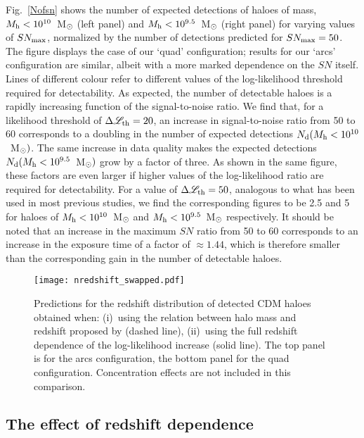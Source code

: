 \documentclass[a4paper, fleqn, usenatbib, useAMS]{mnras}
\def\DL{\Delta\mathscr{L}}
\begin{document}
Fig.~\ref{Nofsn} shows the number of expected detections
of haloes of mass, $M_{\rm h}<10^{10}$~M$_{\rm \odot}$
(left panel) and $M_{\rm h}<10^{9.5}$~M$_{\rm \odot}$ (right panel) for varying
values of $SN_{\rm max}$, normalized by the number of detections
predicted for $SN_{\rm max}=50$. The figure displays the case of our
`quad' configuration; results for our `arcs' configuration are similar, 
albeit with a more marked dependence on the $SN$ itself.
Lines of different colour refer to different
values of the log-likelihood threshold required for detectability.
As expected, the number of detectable haloes is a rapidly increasing function
of the signal-to-noise ratio. We find that, for a likelihood threshold 
of $\DL_{\rm th}=20$, an increase in signal-to-noise ratio from 
50 to 60 corresponds to a doubling in the number of expected detections
$N_{\rm d}(M_{\rm h}<10^{10}$~M$_{\rm \odot})$. The same increase in data quality 
makes the expected detections $N_{\rm d}(M_{\rm h}<10^{9.5}$~M$_{\rm \odot})$
grow by a factor of three. As shown in the same figure, these factors 
are even larger if higher values of the log-likelihood 
ratio are required for detectability. For a value of $\DL_{\rm th}=50$,
analogous to what has been used in most previous studies, we find the corresponding
figures to be 2.5 and 5 for haloes of $M_{\rm h}<10^{10}$~M$_{\rm \odot}$ and 
$M_{\rm h}<10^{9.5}$~M$_{\rm \odot}$ respectively. It should be noted that
an increase in the maximum $SN$ ratio from 50 to 60 corresponds to 
an increase in the exposure time of a factor of $\approx 1.44$, {which is therefore smaller than the corresponding gain
in the number of detectable haloes.}


\begin{figure}
\centering
\texttt{[image: nredshift\_swapped.pdf]}
\caption{Predictions for the redshift distribution of detected CDM haloes obtained when:
(i)~using the relation between halo mass and redshift proposed by \citet{Despali2018} (dashed line),
(ii)~using the full redshift dependence of the log-likelihood increase
(solid line). The top panel is for the arcs configuration, the
bottom panel for the quad configuration. Concentration effects
are not included in this comparison.}
\label{nredshift}
\end{figure}

\subsection{The effect of redshift dependence}
\label{redshiftdependence1}
\end{document}
